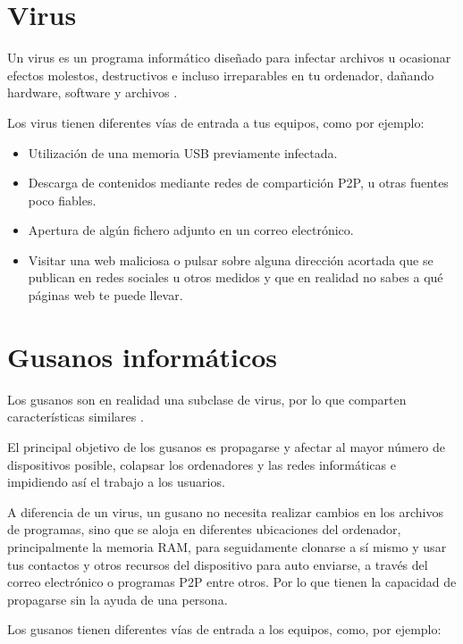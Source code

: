 \documentclass[
  spanish,
  a4paper,
  openany]{book}
\begin{document}
\hypertarget{virus}{%
\section{Virus}\label{virus}}

Un virus es un programa informático diseñado para infectar archivos u ocasionar efectos molestos, destructivos e incluso irreparables en tu ordenador, dañando hardware, software y archivos \citep{PANDA-virus}.

Los virus tienen diferentes vías de entrada a tus equipos, como por ejemplo:

\begin{itemize}
\item
  Utilización de una memoria USB previamente infectada.
\item
  Descarga de contenidos mediante redes de compartición P2P, u otras fuentes poco fiables.
\item
  Apertura de algún fichero adjunto en un correo electrónico.
\item
  Visitar una web maliciosa o pulsar sobre alguna dirección acortada que se publican en redes sociales u otros medidos y que en realidad no sabes a qué páginas web te puede llevar.
\end{itemize}

\hypertarget{gusanos-informuxe1ticos}{%
\section{Gusanos informáticos}\label{gusanos-informuxe1ticos}}

Los gusanos son en realidad una subclase de virus, por lo que comparten características similares \citep{PANDA-gusano}.

El principal objetivo de los gusanos es propagarse y afectar al mayor número de dispositivos posible, colapsar los ordenadores y las redes informáticas e impidiendo así el trabajo a los usuarios.

A diferencia de un virus, un gusano no necesita realizar cambios en los archivos de programas, sino que se aloja en diferentes ubicaciones del ordenador, principalmente la memoria RAM, para seguidamente clonarse a sí mismo y usar tus contactos y otros recursos del dispositivo para auto enviarse, a través del correo electrónico o programas P2P entre otros. Por lo que tienen la capacidad de propagarse sin la ayuda de una persona.

Los gusanos tienen diferentes vías de entrada a los equipos, como, por ejemplo:
\end{document}
